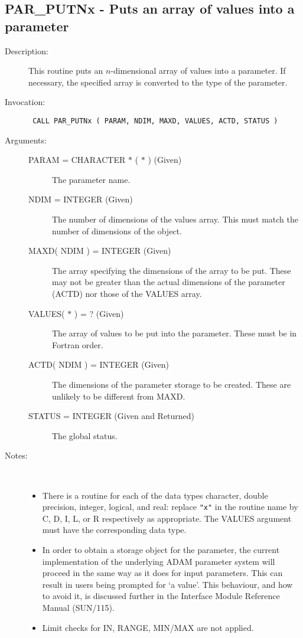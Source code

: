 \documentclass[twoside,11pt]{article}
\newcommand{\xref}[3]{#1}
\newcommand{\xlabel}[1]{}
\newlength{\sstbannerlength}
\newlength{\sstcaptionlength}
\newlength{\sstexampleslength}
\newlength{\sstexampleswidth}
\newcommand{\sstroutine}[3]{
   \goodbreak
   \rule{\textwidth}{0.5mm}
   \vspace{-7ex}
   \newline
   \settowidth{\sstbannerlength}{{\Large {\bf #1}}}
   \setlength{\sstcaptionlength}{\textwidth}
   \setlength{\sstexampleslength}{\textwidth}
   \addtolength{\sstbannerlength}{0.5em}
   \addtolength{\sstcaptionlength}{-2.0\sstbannerlength}
   \addtolength{\sstcaptionlength}{-5.0pt}
   \settowidth{\sstexampleswidth}{{\bf Examples:}}
   \addtolength{\sstexampleslength}{-\sstexampleswidth}
   \parbox[t]{\sstbannerlength}{\flushleft{\Large {\bf #1}}}
   \parbox[t]{\sstcaptionlength}{\center{\Large #2}}
   \parbox[t]{\sstbannerlength}{\flushright{\Large {\bf #1}}}
   \begin{description}
      #3
   \end{description}
}
\newcommand{\sstdescription}[1]{\item[Description:] #1}
\newcommand{\sstinvocation}[1]{\item[Invocation:]\hspace{0.4em}{\tt #1}}
\newcommand{\sstarguments}[1]{
   \item[Arguments:] \mbox{} \\
   \vspace{-3.5ex}
   \begin{description}
      #1
   \end{description}
}
\newcommand{\sstsubsection}[1]{ \item[{#1}] \mbox{} \\}
\newcommand{\sstnotes}[1]{\item[Notes:] \mbox{} \\[1.3ex] #1}
\newcommand{\sstitemlist}[1]{
  \mbox{} \\
  \vspace{-7ex}
  \begin{itemize}
     #1
  \end{itemize}
}
\newcommand{\sstitem}{\item}
\newcommand{\ssttt}{\tt}
\renewcommand{\sstroutine}[3]{
      \subsection{\xlabel{12}#1\xlabel{#1}-\label{#1}#2}
      \begin{description}
         #3
      \end{description}
   }
\renewcommand{\sstdescription}[1]{\item[Description:]
      \begin{description}
         #1
      \end{description}
   }
\renewcommand{\sstinvocation}[1]{\item[Invocation:]
      \begin{description}
         {\ssttt #1}
      \end{description}
   }
\renewcommand{\sstarguments}[1]{
      \item[Arguments:]
      \begin{description}
         #1
      \end{description}
   }
\renewcommand{\sstsubsection}[1]{\item[{#1}]}
\renewcommand{\sstnotes}[1]{\item[Notes:]
      \begin{description}
         #1
      \end{description}
   }
\newcommand{\sstitemlist}[1]{
      \begin{itemize}
         #1
      \end{itemize}
   }
\begin{document}
\sstroutine{
   PAR\_PUTNx
}{
   Puts an array of values into a parameter
}{
   \sstdescription{
      This routine puts an $n$-dimensional array of values into a
      parameter.  If necessary, the specified array is converted to
      the type of the parameter.
   }
   \sstinvocation{
      CALL PAR\_PUTNx ( PARAM, NDIM, MAXD, VALUES, ACTD, STATUS )
   }
   \sstarguments{
      \sstsubsection{
         PARAM = CHARACTER $*$ ( $*$ ) (Given)
      }{
         The parameter name.
      }
      \sstsubsection{
         NDIM = INTEGER (Given)
      }{
         The number of dimensions of the values array.  This must match
         the number of dimensions of the object.
      }
      \sstsubsection{
         MAXD( NDIM ) = INTEGER (Given)
      }{
         The array specifying the dimensions of the array to be put.
         These may not be greater than the actual dimensions of the
         parameter (ACTD) nor those of the VALUES array.
      }
      \sstsubsection{
         VALUES( $*$ ) = ? (Given)
      }{
         The array of values to be put into the parameter.  These must
         be in Fortran order.
      }
      \sstsubsection{
         ACTD( NDIM ) = INTEGER (Given)
      }{
         The dimensions of the parameter storage to be created. These are
         unlikely to be different from MAXD.

      }
      \sstsubsection{
         STATUS = INTEGER (Given and Returned)
      }{
         The global status.
      }
   }
   \sstnotes{
      \sstitemlist{

         \sstitem
         There is a routine for each of the data types character,
         double precision, integer, logical, and real: replace {\tt "x"} in the
         routine name by C, D, I, L, or R respectively as appropriate.  The
         VALUES argument must have the corresponding data type.

         \sstitem
         In order to obtain a storage object for the parameter, the
         current implementation of the underlying ADAM parameter system
         will proceed in the same way as it does for input parameters.
         This can result in users being prompted for `a value'. This
         behaviour, and how to avoid it, is discussed further in the
         Interface Module Reference Manual 
         (\xref{SUN/115}{sun115}{parameter_specification_for_output_parameters}).

         \sstitem
         Limit checks for IN, RANGE, MIN/MAX are not applied.
      }
   }
}
\end{document}
